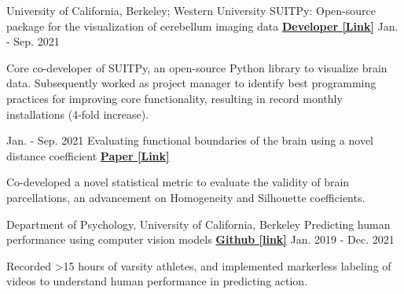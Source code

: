 


\begin{cventries}
    
  \cventry
    {University of California, Berkeley; Western University} %
  	{SUITPy: Open-source package for the visualization of cerebellum imaging data} %
  	{\href{https://suitpy.readthedocs.io/en/latest/}{\textbf{Developer [Link]}}}
  	{Jan. - Sep. 2021}
    {
      \begin{cvitems} %
      	\item {Core co-developer of SUITPy, an open-source Python library to visualize brain data. Subsequently worked as project manager to identify best programming practices for improving core functionality, resulting in record monthly installations (4-fold increase).}
      \end{cvitems}
    }
    
  \cventry
    {Jan. - Sep. 2021} %
    {Evaluating functional boundaries of the brain using a novel distance coefficient} %
    {\href{https://www.biorxiv.org/content/10.1101/2021.05.11.443151v1.full.pdf}{\textbf{Paper [Link]}}}
    {}
    {
      \begin{cvitems} %
        \item {Co-developed a novel statistical metric to evaluate the validity of brain parcellations, an advancement on Homogeneity and Silhouette coefficients.}
      \end{cvitems}
    }    

  \cventry
   	{Department of Psychology, University of California, Berkeley}
    {Predicting human performance using computer vision models} %
    {\href{https://github.com/maedbhk/action_prediction}{\textbf{Github [link]}}}
    {Jan. 2019 - Dec. 2021} %
    {
      \begin{cvitems} %
      	\item {Recorded >15 hours of varsity athletes, and implemented markerless labeling of videos to understand human performance in predicting action.}
      \end{cvitems}
    }
    

\end{cventries}

